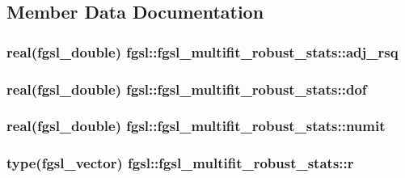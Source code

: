 \subsection{Member Data Documentation}
\hypertarget{structfgsl_1_1fgsl__multifit__robust__stats_af6f5dc1d1021acfc01d428e4b9be7635}{
\subsubsection[{adj\-\_\-rsq}]{\setlength{\rightskip}{0pt plus 5cm}real({\bf fgsl\-\_\-double}) fgsl\-::fgsl\-\_\-multifit\-\_\-robust\-\_\-stats\-::adj\-\_\-rsq}}\label{structfgsl_1_1fgsl__multifit__robust__stats_af6f5dc1d1021acfc01d428e4b9be7635}
\hypertarget{structfgsl_1_1fgsl__multifit__robust__stats_a4490c5d81e7802e064b1ad9910b42b3b}{
\subsubsection[{dof}]{\setlength{\rightskip}{0pt plus 5cm}real({\bf fgsl\-\_\-double}) fgsl\-::fgsl\-\_\-multifit\-\_\-robust\-\_\-stats\-::dof}}\label{structfgsl_1_1fgsl__multifit__robust__stats_a4490c5d81e7802e064b1ad9910b42b3b}
\hypertarget{structfgsl_1_1fgsl__multifit__robust__stats_a9dcebe91b1e3a34ccb49129f10c861bc}{
\subsubsection[{numit}]{\setlength{\rightskip}{0pt plus 5cm}real({\bf fgsl\-\_\-double}) fgsl\-::fgsl\-\_\-multifit\-\_\-robust\-\_\-stats\-::numit}}\label{structfgsl_1_1fgsl__multifit__robust__stats_a9dcebe91b1e3a34ccb49129f10c861bc}
\hypertarget{structfgsl_1_1fgsl__multifit__robust__stats_a3353b0664ef271acdce6aa4b92ace197}{
\subsubsection[{r}]{\setlength{\rightskip}{0pt plus 5cm}type({\bf fgsl\-\_\-vector}) fgsl\-::fgsl\-\_\-multifit\-\_\-robust\-\_\-stats\-::r}}\label{structfgsl_1_1fgsl__multifit__robust__stats_a3353b0664ef271acdce6aa4b92ace197}
